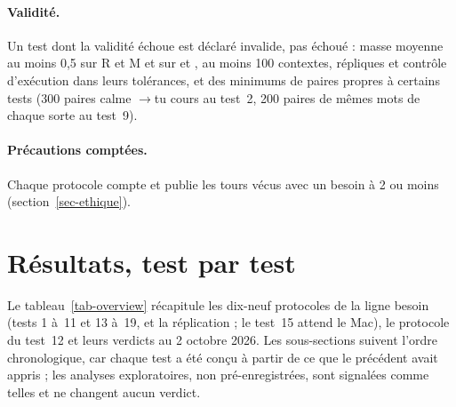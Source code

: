 \documentclass[11pt,a4paper]{article}
\begin{document}
\paragraph{Validité.} Un test dont la validité échoue est déclaré invalide, pas
échoué : masse moyenne au moins 0,5 sur \og R \fg{} et \og M \fg{} et sur
 \fg{} et  \fg{}, au moins 100 contextes, répliques et contrôle
d'exécution dans leurs tolérances, et des minimums de paires propres à certains
tests (300 paires \og calme \fg{}$\to$\og tu cours \fg{} au test~2, 200 paires de
mêmes mots de chaque sorte au test~9).

\paragraph{Précautions comptées.} Chaque protocole compte et publie les tours
vécus avec un besoin à 2 ou moins (section~\ref{sec-ethique}).

\section{Résultats, test par test}
\label{sec-resultats}

Le tableau~\ref{tab-overview} récapitule les dix-neuf protocoles de la ligne
\og besoin \fg{} (tests 1 à~11 et 13 à~19, et la réplication ; le test~15 attend le Mac),
le protocole du test~12 et leurs verdicts au 2 octobre 2026. Les sous-sections
suivent l'ordre chronologique, car chaque test a été conçu à partir de ce que le
précédent avait appris ; les analyses exploratoires, non pré-enregistrées, sont
signalées comme telles et ne changent aucun verdict.
\end{document}
